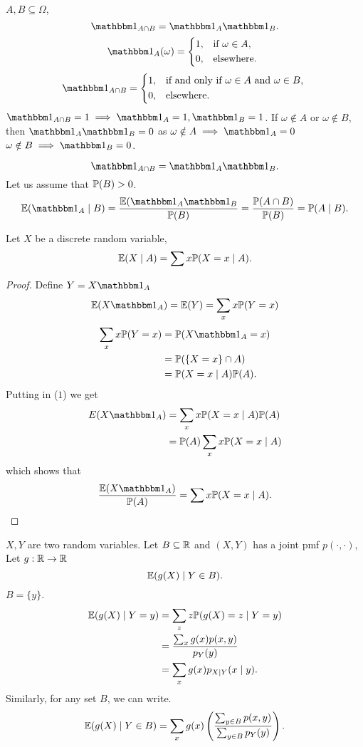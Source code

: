 \documentclass[10pt, a4paper]{article}
\begin{document}
\begin{example}
    $A, B \subseteq \Omega$,
    \[
    \ind[A \cap B] = \ind\ind[B].
    \]
    \[
    \ind(\omega) = \begin{dcases*}
        1, & if $\omega \in A$, \\
        0, & elsewhere.
    \end{dcases*}
    \]
   \[
   \ind[A \cap B] = \begin{dcases*}
       1, & if and only if $\omega \in A$ and $\omega \in B$, \\
       0, & elsewhere.
   \end{dcases*}
   \]
   $\ind[A \cap B] = 1 \implies \ind = 1, \ind[B] = 1$.
   If $\omega \notin A$ or $\omega \notin B$,
   then $\ind[A]\ind[B] = 0$
   as
   $\omega \notin A \implies \ind = 0$
   $\omega \notin B \implies \ind[B] = 0$.

   \[
   \ind[A \cap B] = \ind\ind[B].
   \]
   Let us assume that $\P(B) > 0$.
   \[
   \E(\ind\mid B) = \frac{\E(\ind\ind[B]}{\P(B)} = \frac{\P(A \cap B)}{\P(B)} = \P(A \mid B).
   \]
\end{example}

\begin{theorem}
    Let $X$ be a discrete random variable,
    \[
    \E(X \mid A) = \sum x\P(X = x\mid A).
    \]
    \begin{proof}
        Define $Y = X\ind$
        \begin{equation}
            \E(X\ind) = \E(Y) = \sum_{x}x\P(Y = x)
        \end{equation}
        \begin{align*}
            \sum_{x}x\P(Y = x) &= \P(X\ind = x) \\
            &= \P(\{X = x\} \cap A) \\
            &= \P(X = x\mid A)\P(A).
        \end{align*}
        Putting in ($1$) we get
        \begin{align*}
            E(X\ind) &= \sum_{x}x\P(X = x\mid A)\P(A) \\
            &= \P(A)\sum_{x}x\P(X = x\mid A)
        \end{align*}
        which shows that 
        \[
        \frac{\E(X\ind)}{\P(A)} = \sum x\P(X = x\mid A).
        \]
    \end{proof}
\end{theorem}

\begin{example}
    $X, Y$ are two random variables.
    Let $B \subseteq \R$ and $(X, Y)$ has a joint pmf $p(\cdot, \cdot)$,
    Let $g : \R \rightarrow \R$
    \[
    \E(g(X)\mid Y \in B).
    \]
    $B = \{y\}$.
    \begin{align*}
        \E(g(X)\mid Y = y) &= \sum_{z}z\P(g(X) = z \mid Y = y) \\
        &= \frac{\sum_{x}g(x)p(x, y)}{p_Y(y)} \\
        &= \sum_{x}g(x)p_{X\mid Y}(x \mid y).
    \end{align*}
    Similarly,
    for any set $B$,
    we can write.
    \[
    \E(g(X) \mid Y \in B) = \sum_{x}g(x)\left(\frac{\sum_{y \in B}p(x, y)}{\sum_{y \in B}p_Y(y)}\right).
    \]
\end{example}
\end{document}

